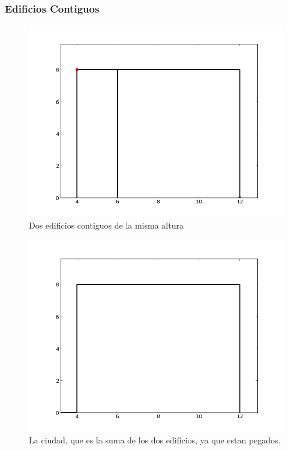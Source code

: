 \subsubsection*{Edificios Contiguos}
\begin{figure}[H]
\begin{center}
\includegraphics[scale=0.5]{./imagenes/ej2_edificio5.png}
\caption{Dos edificios contiguos de la misma altura}
\end{center}
\end{figure}
\begin{figure}[H]
\begin{center}
\includegraphics[scale=0.5]{./imagenes/ej2_edificio5solucion.png}
\caption{La ciudad, que es la suma de los dos edificios, ya que estan pegados.}
\end{center}
\end{figure}



